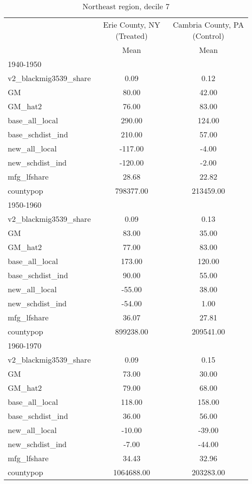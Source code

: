 \begin{table}[htbp]\centering
\def\sym#1{\ifmmode^{#1}\else\(^{#1}\)\fi}
\caption{Northeast region, decile 7 \label{tab1}}
\begin{tabular}{l*{2}{c}}
\toprule
                    &\multicolumn{1}{c}{Erie County, NY (Treated)}&\multicolumn{1}{c}{Cambria County, PA (Control)}\\
                    &        Mean&        Mean\\
\midrule
1940-1950           &            &            \\
v2\_blackmig3539\_share&        0.09&        0.12\\
GM                  &       80.00&       42.00\\
GM\_hat2             &       76.00&       83.00\\
base\_all\_local      &      290.00&      124.00\\
base\_schdist\_ind    &      210.00&       57.00\\
new\_all\_local       &     -117.00&       -4.00\\
new\_schdist\_ind     &     -120.00&       -2.00\\
mfg\_lfshare         &       28.68&       22.82\\
countypop           &   798377.00&   213459.00\\
\midrule
1950-1960           &            &            \\
v2\_blackmig3539\_share&        0.09&        0.13\\
GM                  &       83.00&       35.00\\
GM\_hat2             &       77.00&       83.00\\
base\_all\_local      &      173.00&      120.00\\
base\_schdist\_ind    &       90.00&       55.00\\
new\_all\_local       &      -55.00&       38.00\\
new\_schdist\_ind     &      -54.00&        1.00\\
mfg\_lfshare         &       36.07&       27.81\\
countypop           &   899238.00&   209541.00\\
\midrule
1960-1970           &            &            \\
v2\_blackmig3539\_share&        0.09&        0.15\\
GM                  &       73.00&       30.00\\
GM\_hat2             &       79.00&       68.00\\
base\_all\_local      &      118.00&      158.00\\
base\_schdist\_ind    &       36.00&       56.00\\
new\_all\_local       &      -10.00&      -39.00\\
new\_schdist\_ind     &       -7.00&      -44.00\\
mfg\_lfshare         &       34.43&       32.96\\
countypop           &  1064688.00&   203283.00\\
\bottomrule
\end{tabular}
\end{table}
